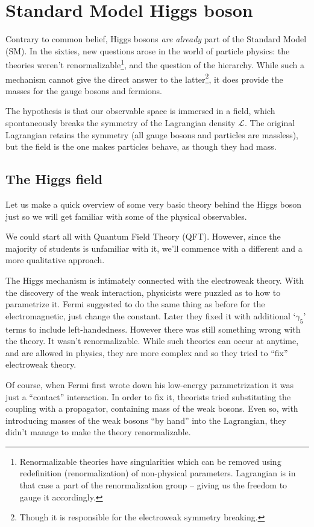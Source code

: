 \section{Standard Model Higgs boson}

Contrary to common belief, Higgs bosons \emph{are already} part of the Standard Model (SM).
In the sixties, new questions arose in the world of particle physics: the theories weren't renormalizable\footnote{Renormalizable theories have
singularities which can be removed using redefinition (renormalization) of non-physical parameters. Lagrangian is in that case a part of the
renormalization group -- giving us the freedom to gauge it accordingly.}, and the question
of the hierarchy. While such a mechanism cannot give the direct answer to the latter\footnote{Though it is responsible for
the electroweak symmetry breaking.}, it does provide the masses for the gauge bosons and fermions.

The hypothesis is that our observable space is immersed in a field, which spontaneously breaks the symmetry of the Lagrangian density
$\mathcal{L}$. The original Lagrangian retains the symmetry (all gauge bosons and particles are massless), but the field is the one
makes particles behave, as though they had mass.

\subsection{The Higgs field}

Let us make a quick overview of some very basic theory behind the Higgs boson just so we will get familiar with some of the
physical observables.

We could start all with Quantum Field Theory (QFT). However, since the majority of students is unfamiliar with it, we'll
commence with a different and a more qualitative approach.

The Higgs mechanism is intimately connected with the electroweak theory. With the discovery of the weak interaction, physicists were
puzzled as to how to parametrize it. Fermi suggested to do the same thing as before for the electromagnetic, just change the
constant. Later they fixed it with additional `$\gamma_5$' terms to include left-handedness. However there was still something
wrong with the theory. It wasn't renormalizable. While such theories can occur at anytime, and are allowed in physics, they are
more complex and so they tried to ``fix'' electroweak theory.

Of course, when Fermi first wrote down his low-energy parametrization it was just a ``contact'' interaction. In order to fix it,
theorists tried substituting the coupling with a propagator, containing mass of the weak bosons. Even so, with introducing
masses of the weak bosons ``by hand'' into the Lagrangian, they didn't manage to make the theory renormalizable.

